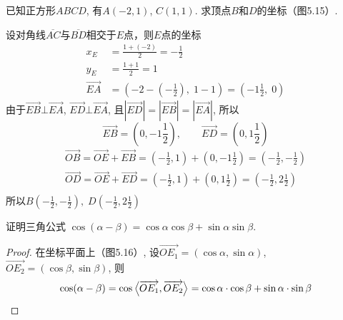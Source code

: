 \begin{example}
    已知正方形$ABCD$, 有$A(-2,1)$, $C(1,1)$. 
求顶点$B$和$D$的坐标（图5.15）.
\end{example}

\begin{solution}
    设对角线$\overline{AC}$与$\overline{BD}$相交于$E$点，则$E$点的坐标
\[\begin{split}
    x_E&=\frac{1+(-2)}{2}=-\frac{1}{2}\\
    y_E&=\frac{1+1}{2}=1\\
    \Vec{EA}&=\left(-2-\left(-\frac{1}{2}\right),\; 1-1\right)=\left(-1\frac{1}{2},\; 0\right)
\end{split}\]
由于$\Vec{EB}\bot \Vec{EA}$, $\Vec{ED}\bot \Vec{EA}$, 
且$|\Vec{ED}|=|\Vec{EB}|=|\Vec{EA}|$, 
所以
\[\Vec{EB}=\left(0,-1\frac{1}{2}\right),\qquad \Vec{ED}=\left(0,1\frac{1}{2}\right)\]
\[\begin{split}
     \Vec{OB}=\Vec{OE}+\Vec{EB}=\left(-\frac{1}{2},1\right)+\left(0,-1\frac{1}{2}\right)=\left(-\frac{1}{2},-\frac{1}{2}\right)\\
     \Vec{OD}=\Vec{OE}+\Vec{ED}=\left(-\frac{1}{2},1\right)+\left(0,1\frac{1}{2}\right)=\left(-\frac{1}{2},2\frac{1}{2}\right)\\
\end{split}\]
所以$B\left(-\frac{1}{2},-\frac{1}{2}\right),\; D\left(-\frac{1}{2},2\frac{1}{2}\right)$
\end{solution}


\begin{example}
    证明三角公式
$\cos(\alpha-\beta) = \cos\alpha\cos\beta+\sin\alpha\sin\beta$.
\end{example}

\begin{figure}[htp]
    \centering
{}
    \caption{}
\end{figure}


\begin{proof}
 在坐标平面上（图5.16）,
设$\Vec{OE_1}=(\cos\alpha,\sin\alpha)$, $\Vec{OE_2}=(\cos\beta,\sin\beta)$, 则
\[\cos(\alpha-\beta)=\cos\left\langle \overrightarrow{OE_1},\overrightarrow{OE_2} \right\rangle=
\cos\alpha\cdot \cos\beta+\sin\alpha\cdot \sin\beta\]   
\end{proof}

